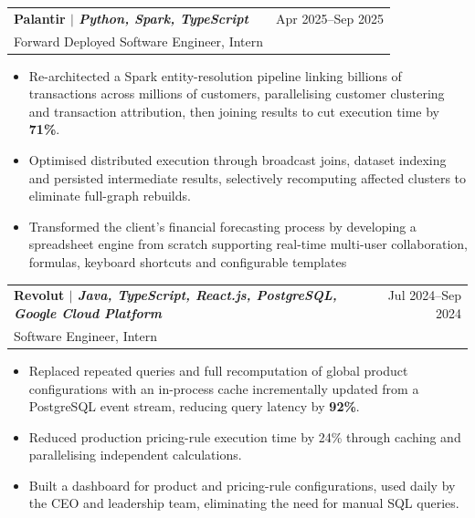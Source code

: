 \documentclass[letterpaper,11pt]{article}
\makeatletter
\newcommand{\resumeItem}[1]{
  \item\small{
    {#1\vspace{-2pt}}
  }
}
\newcommand{\resumeSubheading}[4]{
  \item
    \begin{tabular*}{0.97\textwidth}[t]{l@{\extracolsep{\fill}}r}
      \textbf{#1} & #2 \\
      \textnormal{\small#3} & \textit{\small #4} \\
    \end{tabular*}\vspace{-7pt}
}
\newcommand{\resumeExperienceItemListStart}{\begin{itemize}\addtolength{\itemsep}{2pt}}
\newcommand{\resumeItemListEnd}{\end{itemize}\vspace{-5pt}}
\makeatother
\begin{document}
     \resumeSubheading
      {\textbf{Palantir} $|$ \textnormal{\emph{\small{Python, Spark, TypeScript}}}}{Apr 2025--Sep 2025}
      {Forward Deployed Software Engineer, Intern}{}
      \resumeExperienceItemListStart
        \resumeItem{Re-architected a Spark entity-resolution pipeline linking billions of transactions across millions of customers, parallelising customer clustering and transaction attribution, then joining results to cut execution time by \textbf{71\%}.}
        \resumeItem{Optimised distributed execution through broadcast joins, dataset indexing and persisted intermediate results, selectively recomputing affected clusters to eliminate full-graph rebuilds.}
        \resumeItem{Transformed the client’s financial forecasting process by developing a spreadsheet engine from scratch supporting real-time multi-user collaboration, formulas, keyboard shortcuts and configurable templates}
        
       


      \resumeItemListEnd


    \resumeSubheading
    {\textbf{Revolut} $|$ \textnormal{\emph{\small{Java, TypeScript, React.js, PostgreSQL, Google Cloud Platform}}}}{Jul 2024--Sep 2024}
    {Software Engineer, Intern}{}
    \resumeExperienceItemListStart
      \resumeItem{Replaced repeated queries and full recomputation of global product configurations with an in-process cache incrementally updated from a PostgreSQL event stream, reducing query latency by \textbf{92\%}.}
      \resumeItem{Reduced production pricing-rule execution time by 24\% through caching and parallelising independent calculations.}
      \resumeItem{Built a dashboard for product and pricing-rule configurations, used daily by the CEO and leadership team, eliminating the need for manual SQL queries.}
    \resumeItemListEnd
\end{document}
